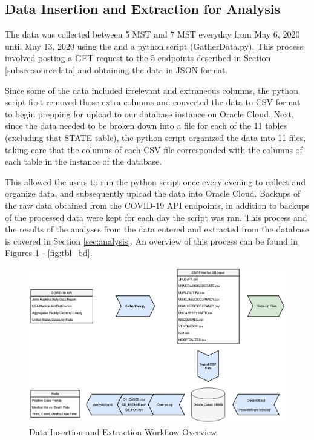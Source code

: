 \documentclass[11pt]{article}
\newcommand{\MYhref}[3][blue]{\href{#2}{\color{#1}{#3}}}%
\begin{document}
\subsection{Data Insertion and Extraction for Analysis}
\label{subsec:insertextract}

\noindent
The data was collected between 5 MST and 7 MST everyday from May 6, 2020 until May 13, 2020 using the \MYhref{https://www.npmjs.com/package/covid19-api}{Covid-19 API} and a python script (GatherData.py). This process involved posting a GET request to the 5 endpoints described in Section \ref{subsec:sourcedata} and obtaining the data in JSON format. 

\noindent
Since some of the data included irrelevant and extraneous columns, the python script first removed those extra columns and converted the data to CSV format to begin prepping for upload to our database instance on Oracle Cloud. Next, since the data needed to be broken down into a file for each of the 11 tables (excluding that STATE table), the python script organized the data into 11 files, taking care that the columns of each CSV file corresponded with the columns of each table in the instance of the database.

\noindent
This allowed the users to run the python script once every evening to collect and organize data, and subsequently upload the data into Oracle Cloud. Backups of the raw data obtained from the COVID-19 API endpoints, in addition to backups of the processed data were kept for each day the script was ran. This process and the results of the analyses from the data entered and extracted from the database is covered in Section \ref{sec:analysis}. An overview of this process can be found in Figures \ref{fig:my_label} - \ref{fig:tbl_bd}.

\FloatBarrier
\begin{figure}[h]
    \centering
    \includegraphics[width=\textwidth]{diagrams/DataInsertionExtraction.png}
    \caption{Data Insertion and Extraction Workflow Overview}
    \label{fig:my_label}
\end{figure}
\FloatBarrier
\end{document}
